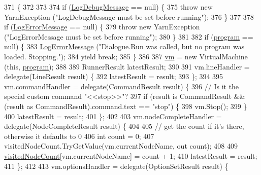 \begin{DoxyCode}
371                                                                                              \{
372 
373 
374             \textcolor{keywordflow}{if} (\hyperlink{a00070_a381f48bb0fbb294f8cf44ca57f11be31}{LogDebugMessage} == null) \{
375                 \textcolor{keywordflow}{throw} \textcolor{keyword}{new} YarnException (\textcolor{stringliteral}{"LogDebugMessage must be set before running"});
376             \}
377 
378             \textcolor{keywordflow}{if} (\hyperlink{a00070_a9801e83dd044d6498fdf6ebcc6bec5ac}{LogErrorMessage} == null) \{
379                 \textcolor{keywordflow}{throw} \textcolor{keyword}{new} YarnException (\textcolor{stringliteral}{"LogErrorMessage must be set before running"});
380             \}
381 
382             \textcolor{keywordflow}{if} (\hyperlink{a00070_a0a1cca92325f430425d784d416cb5c2b}{program} == null) \{
383                 \hyperlink{a00070_a9801e83dd044d6498fdf6ebcc6bec5ac}{LogErrorMessage} (\textcolor{stringliteral}{"Dialogue.Run was called, but no program was loaded.
       Stopping."});
384                 yield \textcolor{keywordflow}{break};
385             \}
386 
387             \hyperlink{a00070_a8c1319357a9df6cff051328fb33224c7}{vm} = \textcolor{keyword}{new} VirtualMachine (\textcolor{keyword}{this}, \hyperlink{a00070_a0a1cca92325f430425d784d416cb5c2b}{program});
388 
389             RunnerResult latestResult;
390 
391             vm.lineHandler = delegate(LineResult result) \{
392                 latestResult = result;
393             \};
394 
395             vm.commandHandler = delegate(CommandResult result) \{
396                 \textcolor{comment}{// Is it the special custom command "<<stop>>"?}
397                 \textcolor{keywordflow}{if} (result is CommandResult && (result as CommandResult).command.text == \textcolor{stringliteral}{"stop"}) \{
398                     vm.Stop();
399                 \}
400                 latestResult = result;
401             \};
402 
403             vm.nodeCompleteHandler = delegate(NodeCompleteResult result) \{
404 
405                 \textcolor{comment}{// get the count if it's there, otherwise it defaults to 0}
406                 \textcolor{keywordtype}{int} count = 0;
407                 visitedNodeCount.TryGetValue(vm.currentNodeName, out count);
408 
409                 \hyperlink{a00070_aae9e64354066a1e2fa130629959d772b}{visitedNodeCount}[vm.currentNodeName] = count + 1;
410                 latestResult = result;
411             \};
412 
413             vm.optionsHandler = delegate(OptionSetResult result) \{

\end{DoxyCode}
